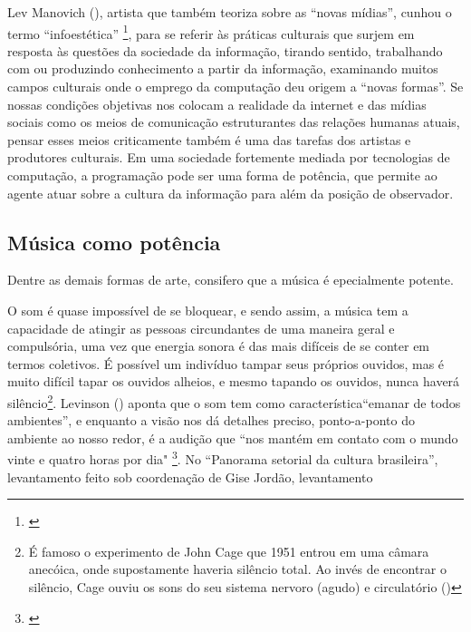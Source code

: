  Lev Manovich (\citeyear{Manovich2008}), artista que também teoriza sobre as ``novas mídias'', cunhou o termo ``infoestética'' \footnote{\cite{Manovich2008}}, para se referir às práticas culturais que surjem em resposta às questões da sociedade da informação, tirando sentido, trabalhando com ou produzindo conhecimento a partir da informação, examinando muitos campos culturais onde o emprego da computação deu origem a ``novas formas''. Se nossas condições objetivas nos colocam a realidade da internet e das mídias sociais como os meios de comunicação estruturantes das relações humanas atuais, pensar esses meios criticamente também é uma das tarefas dos artistas e produtores culturais. Em uma sociedade fortemente mediada por tecnologias de computação, a programação pode ser uma forma de potência, que permite ao agente atuar sobre a cultura da informação para além da posição de observador.

\subsection{Música como potência}
Dentre as demais formas de arte, consifero que a música é epecialmente potente. 


O som é quase impossível de se bloquear, e sendo assim, a música tem a capacidade de atingir as pessoas circundantes de uma maneira geral e compulsória, uma vez que energia sonora é das mais difíceis de se conter em termos coletivos. É possível um indivíduo tampar seus próprios ouvidos, mas é muito difícil tapar os ouvidos alheios, e mesmo tapando os ouvidos, nunca haverá silêncio\footnote{É famoso o experimento de John Cage que 1951 entrou em uma câmara anecóica, onde supostamente haveria silêncio total. Ao invés de encontrar o silêncio, Cage ouviu os sons do seu sistema nervoro (agudo) e circulatório (\cite{Mauceri1997})}. Levinson (\citeyear{Levinson2001}) aponta que o som tem como característica``emanar de todos ambientes'', e enquanto a visão nos dá detalhes preciso, ponto-a-ponto do ambiente ao nosso redor, é a audição que ``nos mantém em contato com o mundo vinte e quatro horas por dia" \footnote{\cite[47]{Levinson2001}}. No ``Panorama setorial da cultura brasileira'', levantamento feito sob coordenação de Gise Jordão, levantamento 
 

